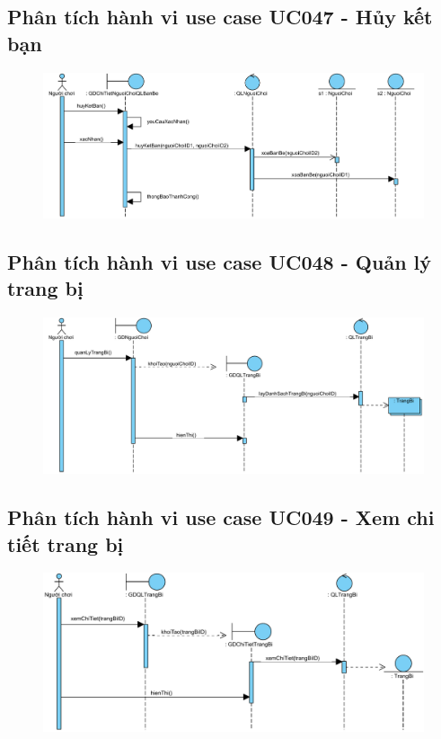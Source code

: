 \documentclass[3p]{elsarticle}
\begin{document}
\subsection{Phân tích hành vi use case UC047 - Hủy kết bạn}
\begin{figure}[!htbp]
	\hspace*{-.5in}
	\centering
	\includegraphics[scale=.55]{images/sequence-pdfs/gamer/FriendManagement_Unfriend.pdf}
\end{figure}
\newpage

\subsection{Phân tích hành vi use case UC048 - Quản lý trang bị}
\begin{figure}[!htbp]
	\hspace*{-.5in}
	\centering
	\includegraphics[scale=.53]{images/sequence-pdfs/gamer/ItemManagement.pdf}
\end{figure}
\subsection{Phân tích hành vi use case UC049 - Xem chi tiết trang bị}
\begin{figure}[!htbp]
	\hspace*{-.5in}
	\centering
	\includegraphics[scale=.55]{images/sequence-pdfs/gamer/ItemManagement_ViewDetail.pdf}
\end{figure}
\newpage
\end{document}
